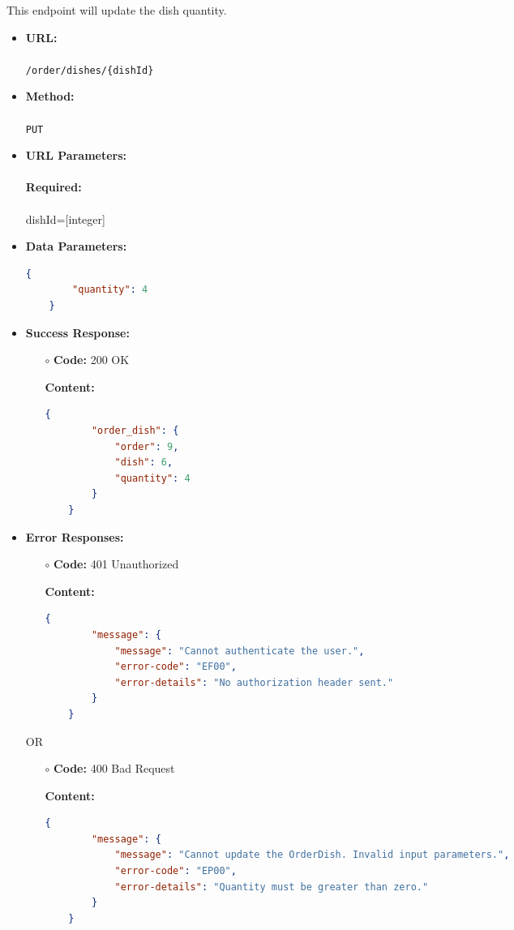 

This endpoint will update the dish quantity.

\begin{itemize}
    \item \textbf{URL:} \\\\\texttt{/order/dishes/\{dishId\}}
    \item \textbf{Method:} \\\\\texttt{PUT}
    \item \textbf{URL Parameters:} \\\\
	\textbf{Required:}\\\\
	dishId=[integer]
    \item \textbf{Data Parameters:}
    \begin{lstlisting}[language=json]
	{
    	"quantity": 4
	}
	\end{lstlisting}
    \item \textbf{Success Response:}
		\begin{itemize}
			\item[$\circ$] \textbf{Code:} 200 OK
			\item[] \textbf{Content:}
			\medskip
			\begin{lstlisting}[language=json]
	{
		"order_dish": {
			"order": 9,
			"dish": 6,
			"quantity": 4
		}
	}
			\end{lstlisting}
		\end{itemize}
	   \item \textbf{Error Responses:}
    	\begin{itemize}
			\item[$\circ$] \textbf{Code:} 401 Unauthorized
			\item[] \textbf{Content:}
			\begin{lstlisting}[language=json]
	{
		"message": {
			"message": "Cannot authenticate the user.",
			"error-code": "EF00",
			"error-details": "No authorization header sent."
		}
	}
			\end{lstlisting}
		\end{itemize}
	OR
    	\begin{itemize}
			\item[$\circ$] \textbf{Code:} 400 Bad Request
			\item[] \textbf{Content:}
			\begin{lstlisting}[language=json]
	{
		"message": {
			"message": "Cannot update the OrderDish. Invalid input parameters.",
			"error-code": "EP00",
			"error-details": "Quantity must be greater than zero."
		}
	}		
			\end{lstlisting}
		\end{itemize}
    					

\end{itemize}
